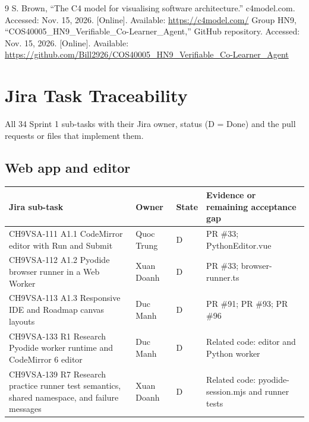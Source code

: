 \documentclass[11pt,a4paper]{article}
\begin{document}
\clearpage
{}
\begin{thebibliography}{9}
 S. Brown, ``The C4 model for visualising software architecture.'' c4model.com. Accessed: Nov. 15, 2026. [Online]. Available: \url{https://c4model.com/}
 Group HN9, ``COS40005\_HN9\_Verifiable\_Co-Learner\_Agent,'' GitHub repository. Accessed: Nov. 15, 2026. [Online]. Available: \url{https://github.com/Bill2926/COS40005_HN9_Verifiable_Co-Learner_Agent}
\end{thebibliography}
\appendix
\section{Jira Task Traceability}
All 34 Sprint 1 sub-tasks with their Jira owner, status (D = Done) and the pull requests or files that implement them.

\subsection{Web app and editor}
{\small
\begin{longtable}{>{\raggedright\arraybackslash}p{}>{\raggedright\arraybackslash}p{}>{\raggedright\arraybackslash}p{}>{\raggedright\arraybackslash}p{}}
\toprule
\textbf{Jira sub-task} & \textbf{Owner} & \textbf{State} & \textbf{Evidence or remaining acceptance gap} \\
\midrule
\endhead
CH9VSA-111 \newline A1.1 CodeMirror editor with Run and Submit & Quoc Trung & D & PR \#33; PythonEditor.vue \\
CH9VSA-112 \newline A1.2 Pyodide browser runner in a Web Worker & Xuan Doanh & D & PR \#33; browser-runner.ts \\
CH9VSA-113 \newline A1.3 Responsive IDE and Roadmap canvas layouts & Duc Manh & D & PR \#91; PR \#93; PR \#96 \\
CH9VSA-133 \newline R1 Research Pyodide worker runtime and CodeMirror 6 editor & Duc Manh & D & Related code: editor and Python worker \\
CH9VSA-139 \newline R7 Research practice runner test semantics, shared namespace, and failure messages & Xuan Doanh & D & Related code: pyodide-session.mjs and runner tests \\
\bottomrule
\end{longtable}}
\end{document}
